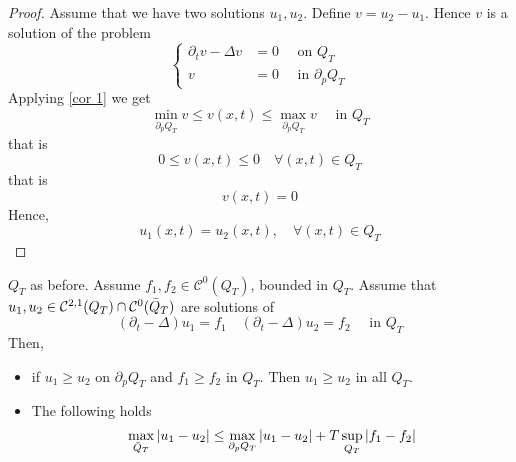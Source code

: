\begin{ProofBox}
    \begin{proof}
        Assume that we have two solutions $u_1, u_2$. Define $v = u_2 - u_1$. Hence $v$ is a solution of the problem
        \begin{equation*}
            \begin{cases}
                \partial_t v - \Delta v &= 0 \quad \text{ on } Q_T \\
                v &= 0 \quad \text{ in }  \partial_p Q_T
            \end{cases}
        \end{equation*}
        Applying \ref{cor 1} we get 
        \begin{equation*}
            \min_{ \partial_p Q_T} v \leq v(x,t) \leq \max_{ \partial_p Q_T} v \quad \text{ in } Q_T
        \end{equation*}
        that is 
        \begin{equation*}
            0 \leq v(x,t) \leq 0 \quad \forall (x,t) \in Q_T
        \end{equation*}
        that is 
        \begin{equation*}
            v(x,t) = 0
        \end{equation*}
        Hence,
        \begin{equation*}
            u_1(x,t) = u_2(x,t), \quad \forall (x,t) \in Q_T
        \end{equation*}
    \end{proof}
\end{ProofBox}
\begin{PropBox}
    \begin{Cor}
        $Q_T$ as before. Assume $f_1,f_2 \in \mathcal{C}^0(Q_T)$, bounded in $Q_T$. Assume that $u_1,u_2 \in \mathcal{C}^{2,1}(Q_T) \cap \mathcal{C}^0(\Bar{Q}_T)$ are solutions of 
        \begin{equation*}
            (\partial_t - \Delta) u_1 = f_1 \quad (\partial_t - \Delta)u_2 = f_2 \quad \text{ in } Q_T
        \end{equation*}
        Then, 
        \begin{itemize}
            \item if $u_1 \geq u_2$ on $ \partial_p Q_T$ and $f_1 \geq f_2$ in $Q_T$. Then $u_1 \geq u_2$ in all $Q_T$.
            \item The following holds
            \begin{equation*}
                \max_{\Bar{Q}_T} |u_1 - u_2| \leq \max_{ \partial_p Q_T} |u_1 - u_2 | + T \sup_{Q_T} |f_1-f_2|
            \end{equation*}
        \end{itemize}
    \end{Cor}
\end{PropBox}
